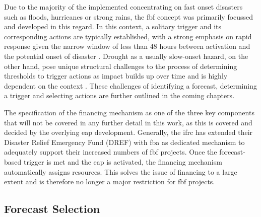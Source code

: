 Due to the majority of the implemented  concentrating on fast onset disasters such as floods, hurricanes or strong rains, the \acrlong{fbf} concept was primarily focussed and developed in this regard. In this context, a solitary trigger and its corresponding actions are typically established, with a strong emphasis on rapid response given the narrow window of less than 48 hours between activation and the potential onset of disaster \autocite{rcrcFORECASTBASEDFINANCINGEARLY2020}. Drought as a usually slow-onset hazard, on the other hand, pose unique structural challenges to the process of determining thresholds to trigger actions as impact builds up over time and is highly dependent on the context \autocite{boultDroughtImpactbasedForecasting2022}. These challenges of identifying a forecast, determining a trigger and selecting actions are further outlined in the coming chapters.

The specification of the financing mechanism as one of the three key components that will not be covered in any further detail in this work, as this is covered and decided by the overlying \acrshort{eap} development. Generally, the \acrshort{ifrc} has extended their Disaster Relief Emergency Fund (DREF) with \acrfull{fba} as dedicated mechanism to adequately support their increased numbers of \acrshort{fbf} projects. Once the forecast-based trigger is met and the \acrshort{eap} is activated, the financing mechanism automatically assigns resources. This solves the issue of financing to a large extent and is therefore no longer a major restriction for \acrshort{fbf} projects.


\subsection{Forecast Selection}

